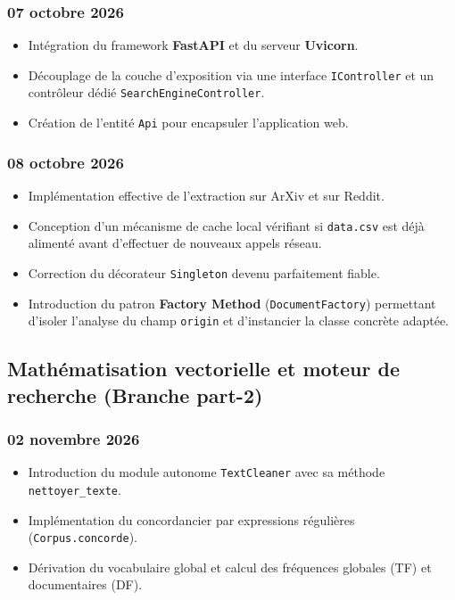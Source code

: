 \documentclass[12pt,a4paper]{article}
\begin{document}
\subsubsection{07 octobre 2026}
\begin{itemize}
    \item Intégration du framework \textbf{FastAPI} et du serveur \textbf{Uvicorn}.
    \item Découplage de la couche d'exposition via une interface \texttt{IController} et un contrôleur dédié \texttt{SearchEngineController}.
    \item Création de l'entité \texttt{Api} pour encapsuler l'application web.
\end{itemize}

\subsubsection{08 octobre 2026}
\begin{itemize}
    \item Implémentation effective de l'extraction sur ArXiv et sur Reddit.
    \item Conception d'un mécanisme de cache local vérifiant si \texttt{data.csv} est déjà alimenté avant d'effectuer de nouveaux appels réseau.
    \item Correction du décorateur \texttt{Singleton} devenu parfaitement fiable.
    \item Introduction du patron \textbf{Factory Method} (\texttt{DocumentFactory}) permettant d'isoler l'analyse du champ  \texttt{origin} et d'instancier la classe concrète adaptée.
\end{itemize}

\subsection{Mathématisation vectorielle et moteur de recherche (Branche part-2)}

\subsubsection{02 novembre 2026}

\begin{itemize}
	\item Introduction du module autonome \texttt{TextCleaner} avec sa méthode \texttt{nettoyer\_texte}.
	\item Implémentation du concordancier par expressions régulières (\texttt{Corpus.concorde}).
	\item Dérivation du vocabulaire global et calcul des fréquences globales (TF) et documentaires (DF).
\end{itemize}
\end{document}
